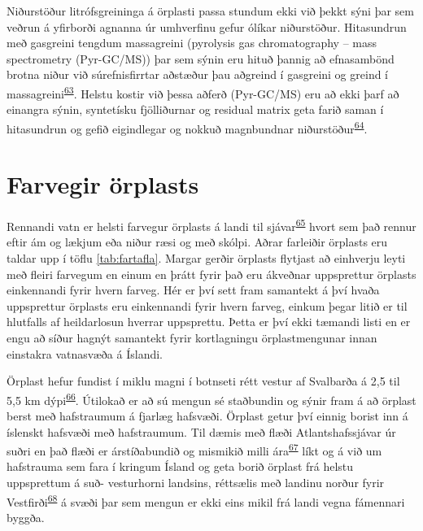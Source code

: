 \documentclass[icelandic,]{book}
\begin{document}


Niðurstöður litrófsgreininga á örplasti passa stundum ekki við þekkt sýni þar sem veðrun á yfirborði agnanna úr umhverfinu gefur ólíkar niðurstöður.
Hitasundrun með gasgreini tengdum massagreini (pyrolysis gas chromatography -- mass spectrometry (Pyr-GC/MS)) þar sem sýnin eru hituð þannig að efnasambönd brotna niður við súrefnisfirrtar aðstæður þau aðgreind í gasgreini og greind í massagreini\textsuperscript{\protect\hyperlink{ref-k22014bio2}{63}}. Helstu kostir við þessa aðferð (Pyr-GC/MS) eru að ekki þarf að einangra sýnin, syntetísku fjölliðurnar og residual matrix geta farið saman í hitasundrun og gefið eigindlegar og nokkuð magnbundnar niðurstöður\textsuperscript{\protect\hyperlink{ref-Fischer2017}{64}}.

\hypertarget{farvegir-orplasts}{%
\chapter{Farvegir örplasts}\label{farvegir-orplasts}}

Rennandi vatn er helsti farvegur örplasts á landi til sjávar\textsuperscript{\protect\hyperlink{ref-unice2019characterizing1}{65}} hvort sem það rennur eftir ám og lækjum eða niður ræsi og með skólpi. Aðrar farleiðir örplasts eru taldar upp í töflu \ref{tab:fartafla}. Margar gerðir örplasts flytjast að einhverju leyti með fleiri farvegum en einum en þrátt fyrir það eru ákveðnar uppsprettur örplasts einkennandi fyrir hvern farveg. Hér er því sett fram samantekt á því hvaða uppsprettur örplasts eru einkennandi fyrir hvern farveg, einkum þegar litið er til hlutfalls af heildarlosun hverrar uppsprettu. Þetta er því ekki tæmandi listi en er engu að síður hagnýt samantekt fyrir kortlagningu örplastmengunar innan einstakra vatnasvæða á Íslandi.

Örplast hefur fundist í miklu magni í botnseti rétt vestur af Svalbarða á 2,5 til 5,5 km dýpi\textsuperscript{\protect\hyperlink{ref-Bergmann2017}{66}}. Útilokað er að sú mengun sé staðbundin og sýnir fram á að örplast berst með hafstraumum á fjarlæg hafsvæði. Örplast getur því einnig borist inn á íslenskt hafsvæði með hafstraumum. Til dæmis með flæði Atlantshafssjávar úr suðri en það flæði er árstíðabundið og mismikið milli ára\textsuperscript{\protect\hyperlink{ref-Strait2005a}{67}} líkt og á við um hafstrauma sem fara í kringum Ísland og geta borið örplast frá helstu uppsprettum á suð- vesturhorni landsins, réttsælis með landinu norður fyrir Vestfirði\textsuperscript{\protect\hyperlink{ref-Astthorsson1994}{68}} á svæði þar sem mengun er ekki eins mikil frá landi vegna fámennari byggða.
\end{document}
